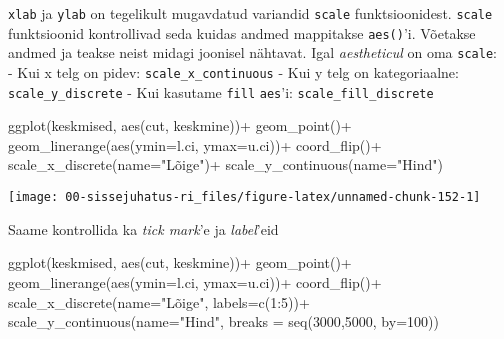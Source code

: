 \documentclass[
]{book}
\newenvironment{Shaded}{\begin{snugshade}}{\end{snugshade}}
\newcommand{\AttributeTok}[1]{\textcolor[rgb]{0.77,0.63,0.00}{#1}}
\newcommand{\DecValTok}[1]{\textcolor[rgb]{0.00,0.00,0.81}{#1}}
\newcommand{\FunctionTok}[1]{\textcolor[rgb]{0.00,0.00,0.00}{#1}}
\newcommand{\NormalTok}[1]{#1}
\newcommand{\SpecialCharTok}[1]{\textcolor[rgb]{0.00,0.00,0.00}{#1}}
\newcommand{\StringTok}[1]{\textcolor[rgb]{0.31,0.60,0.02}{#1}}
\begin{document}
\texttt{xlab} ja \texttt{ylab} on tegelikult mugavdatud variandid \texttt{scale} funktsioonidest. \texttt{scale} funktsioonid kontrollivad seda kuidas andmed mappitakse \texttt{aes()}'i. Võetakse andmed ja teakse neist midagi joonisel nähtavat. Igal \emph{aestheticul} on oma \texttt{scale}:\\
- Kui x telg on pidev: \texttt{scale\_x\_continuous}
- Kui y telg on kategoriaalne: \texttt{scale\_y\_discrete}
- Kui kasutame \texttt{fill} \texttt{aes}'i: \texttt{scale\_fill\_discrete}

\begin{Shaded}
\begin{Highlighting}[]
\FunctionTok{ggplot}\NormalTok{(keskmised, }\FunctionTok{aes}\NormalTok{(cut, keskmine))}\SpecialCharTok{+}
  \FunctionTok{geom\_point}\NormalTok{()}\SpecialCharTok{+}
  \FunctionTok{geom\_linerange}\NormalTok{(}\FunctionTok{aes}\NormalTok{(}\AttributeTok{ymin=}\NormalTok{l.ci, }\AttributeTok{ymax=}\NormalTok{u.ci))}\SpecialCharTok{+}
  \FunctionTok{coord\_flip}\NormalTok{()}\SpecialCharTok{+}
  \FunctionTok{scale\_x\_discrete}\NormalTok{(}\AttributeTok{name=}\StringTok{"Lõige"}\NormalTok{)}\SpecialCharTok{+}
  \FunctionTok{scale\_y\_continuous}\NormalTok{(}\AttributeTok{name=}\StringTok{"Hind"}\NormalTok{)}
\end{Highlighting}
\end{Shaded}

\begin{center}\texttt{[image: 00-sissejuhatus-ri\_files/figure-latex/unnamed-chunk-152-1]} \end{center}

Saame kontrollida ka \emph{tick mark}'e ja \emph{label}'eid

\begin{Shaded}
\begin{Highlighting}[]
\FunctionTok{ggplot}\NormalTok{(keskmised, }\FunctionTok{aes}\NormalTok{(cut, keskmine))}\SpecialCharTok{+}
  \FunctionTok{geom\_point}\NormalTok{()}\SpecialCharTok{+}
  \FunctionTok{geom\_linerange}\NormalTok{(}\FunctionTok{aes}\NormalTok{(}\AttributeTok{ymin=}\NormalTok{l.ci, }\AttributeTok{ymax=}\NormalTok{u.ci))}\SpecialCharTok{+}
  \FunctionTok{coord\_flip}\NormalTok{()}\SpecialCharTok{+}
  \FunctionTok{scale\_x\_discrete}\NormalTok{(}\AttributeTok{name=}\StringTok{"Lõige"}\NormalTok{, }\AttributeTok{labels=}\FunctionTok{c}\NormalTok{(}\DecValTok{1}\SpecialCharTok{:}\DecValTok{5}\NormalTok{))}\SpecialCharTok{+}
  \FunctionTok{scale\_y\_continuous}\NormalTok{(}\AttributeTok{name=}\StringTok{"Hind"}\NormalTok{, }\AttributeTok{breaks =} \FunctionTok{seq}\NormalTok{(}\DecValTok{3000}\NormalTok{,}\DecValTok{5000}\NormalTok{, }\AttributeTok{by=}\DecValTok{100}\NormalTok{))}
\end{Highlighting}
\end{Shaded}
\end{document}
